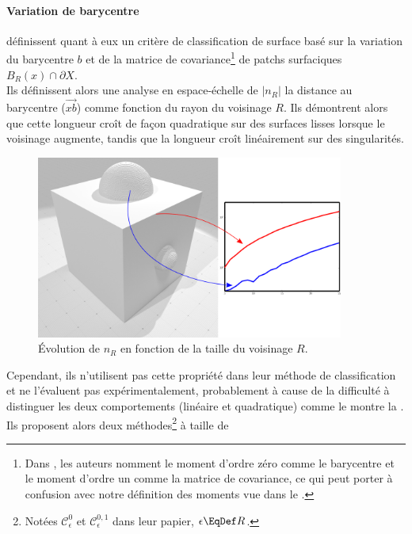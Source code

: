 \paragraph{Variation de barycentre}
%
 définissent quant à eux un critère de
classification de surface basé sur la variation du barycentre $b$ et de la
matrice de covariance\footnote{Dans \cite{Telea2004}, les auteurs nomment le
moment d'ordre zéro comme le barycentre et le moment d'ordre un comme la matrice
de covariance, ce qui peut porter à confusion avec notre définition des moments
vue dans le .} de patchs surfaciques
$B_R(x)\cap \partial X$.
%
\\
%
Ils définissent alors une analyse en espace-échelle de $|n_R|$ la distance au barycentre ($\vec{xb}$) comme fonction du rayon du voisinage $R$. Ils démontrent
alors que cette longueur croît de façon quadratique sur des surfaces lisses
lorsque le voisinage augmente, tandis que la longueur croît linéairement sur des
singularités.
%
\begin{figure}[ht]{
    \begin{center}
    \includegraphics[height=6cm]{figures/CubeSpherePlotMoment_SS}
    \end{center}}
    \caption[Évolution de $n_R$ en fonction de la taille du voisinage $R$]{Évolution de $n_R$ en fonction de la taille du voisinage $R$.
      \label{fig:moment-multiscale}}
\end{figure}
%
Cependant, ils n'utilisent pas cette propriété dans leur méthode de
classification et ne l'évaluent pas expérimentalement, probablement à cause de la difficulté à distinguer les deux comportements (linéaire et quadratique) comme le montre la .
%
\\
%
Ils proposent alors deux méthodes\footnote{Notées $\mathcal{C}_{\epsilon}^{0}$
et $\mathcal{C}_{\epsilon}^{0,1}$ dans leur papier, $\epsilon \EqDef R$.} à taille de

